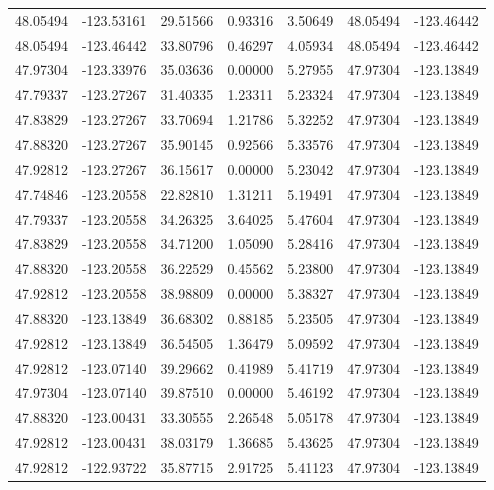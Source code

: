 \documentclass[draft]{agujournal2019}
\begin{document}
\begin{center}
\begin{longtable}{c c c c c c c}
48.05494 & -123.53161 & 29.51566 & 0.93316 & 3.50649 & 48.05494 & -123.46442 \\
48.05494 & -123.46442 & 33.80796 & 0.46297 & 4.05934 & 48.05494 & -123.46442 \\
47.97304 & -123.33976 & 35.03636 & 0.00000 & 5.27955 & 47.97304 & -123.13849 \\
47.79337 & -123.27267 & 31.40335 & 1.23311 & 5.23324 & 47.97304 & -123.13849 \\
47.83829 & -123.27267 & 33.70694 & 1.21786 & 5.32252 & 47.97304 & -123.13849 \\
47.88320 & -123.27267 & 35.90145 & 0.92566 & 5.33576 & 47.97304 & -123.13849 \\
47.92812 & -123.27267 & 36.15617 & 0.00000 & 5.23042 & 47.97304 & -123.13849 \\
47.74846 & -123.20558 & 22.82810 & 1.31211 & 5.19491 & 47.97304 & -123.13849 \\
47.79337 & -123.20558 & 34.26325 & 3.64025 & 5.47604 & 47.97304 & -123.13849 \\
47.83829 & -123.20558 & 34.71200 & 1.05090 & 5.28416 & 47.97304 & -123.13849 \\
47.88320 & -123.20558 & 36.22529 & 0.45562 & 5.23800 & 47.97304 & -123.13849 \\
47.92812 & -123.20558 & 38.98809 & 0.00000 & 5.38327 & 47.97304 & -123.13849 \\
47.88320 & -123.13849 & 36.68302 & 0.88185 & 5.23505 & 47.97304 & -123.13849 \\
47.92812 & -123.13849 & 36.54505 & 1.36479 & 5.09592 & 47.97304 & -123.13849 \\
47.92812 & -123.07140 & 39.29662 & 0.41989 & 5.41719 & 47.97304 & -123.13849 \\
47.97304 & -123.07140 & 39.87510 & 0.00000 & 5.46192 & 47.97304 & -123.13849 \\
47.88320 & -123.00431 & 33.30555 & 2.26548 & 5.05178 & 47.97304 & -123.13849 \\
47.92812 & -123.00431 & 38.03179 & 1.36685 & 5.43625 & 47.97304 & -123.13849 \\
47.92812 & -122.93722 & 35.87715 & 2.91725 & 5.41123 & 47.97304 & -123.13849 \\
\hline
\end{longtable}
\end{center}
\end{document}
